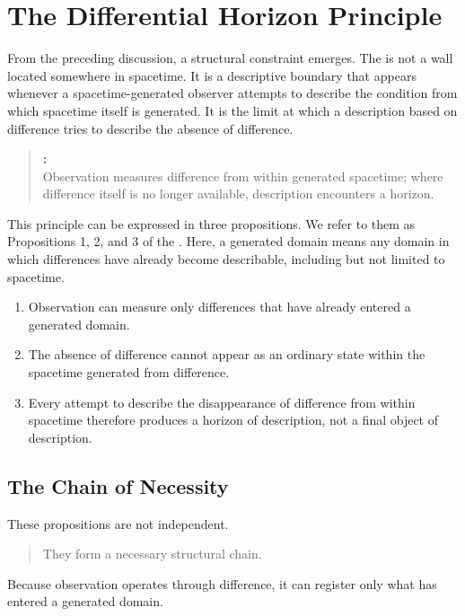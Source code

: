 \section{The Differential Horizon Principle}

\label{sec:principle}

From the preceding discussion,
a structural constraint emerges.
The \DH{} is not a wall located somewhere in spacetime.
It is a descriptive boundary that appears whenever a
spacetime-generated observer attempts to describe the condition
from which spacetime itself is generated.
It is the limit at which a description based on difference tries
to describe the absence of difference.

\medskip
\begin{quote}
\textbf{\DHP{}:}\\
Observation measures difference from within generated spacetime;
where difference itself is no longer available,
description encounters a horizon.
\end{quote}
\medskip

This principle can be expressed in three propositions.
We refer to them as Propositions 1, 2, and 3
of the \DHP{}.
Here,
a generated domain means any domain in which differences have already
become describable,
including but not limited to spacetime.

\begin{enumerate}
  \item Observation can measure only differences that have already
  entered a generated domain.
  \item The absence of difference cannot appear as an ordinary state
  within the spacetime generated from difference.
  \item Every attempt to describe the disappearance of difference
  from within spacetime therefore produces a horizon of description,
  not a final object of description.
\end{enumerate}

\subsection*{The Chain of Necessity}

These propositions are not independent.

\medskip
\begin{quote}
They form a necessary structural chain.
\end{quote}
\medskip

Because observation operates through difference,
it can register only what has entered a generated domain.

